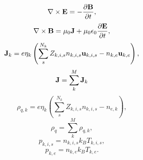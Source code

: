 \documentclass[a4paper,11pt]{report}
\begin{document}
\begin{equation}
    \label{eq:mf_mm_maxwell_1}
    \nabla \times \mathbf{E} = -\frac{ \partial \mathbf{B}}{\partial t},
\end{equation}
\begin{equation}
    \label{eq:mf_mm_maxwell_2}
    \nabla \times \mathbf{B} = \mu_0 \mathbf{J} + \mu_0 \epsilon_0 \frac{\partial \mathbf{E}}{\partial t},
\end{equation}
\begin{equation}
    \label{eq:mf_mm_curr_density}
    \mathbf{J}_k = e \eta_k \left( \sum_s^{N_k} Z_{k,i,s} n_{k,i,s} \mathbf{u}_{k,i,s} - n_{k,e} \mathbf{u}_{k,e} \right),
\end{equation}
\begin{equation}
    \mathbf{J} = \sum_k^M \mathbf{J}_k
\end{equation}
\begin{equation}
    \label{eq:mf_mm_mass_density}
    \rho_{q,k} = e \eta_k \left( \sum_s^{N_k} Z_{k,i,s} n_{k,i,s} - n_{e,k} \right),
\end{equation}
\begin{equation}
    \rho_q = \sum_k^M \rho_{q,k},
\end{equation}
\begin{equation}
    \label{eq:mf_mm_eos_ion}
    p_{k,i,s} = n_{k,i,s} k_B T_{k,i,s},
\end{equation}
\begin{equation}
    \label{eq:mf_mm_eos_elec}
    p_{k,e} = n_{k,e} k_B T_{k,e}.
\end{equation}

\end{document}
